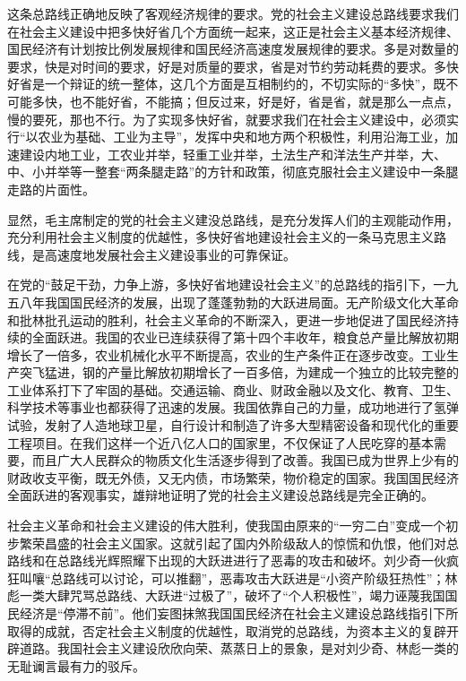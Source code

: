 \documentclass{book}
\begin{document}
这条总路线正确地反映了客观经济规律的要求。党的社会主义建设总路线要求我们在社会主义建设中把多快好省几个方面统一起来，这正是社会主义基本经济规律、国民经济有计划按比例发展规律和国民经济高速度发展规律的要求。多是对数量的要求，快是对时间的要求，好是对质量的要求，省是对节约劳动耗费的要求。多快好省是一个辩证的统一整体，这几个方面是互相制约的，不切实际的“多快”，既不可能多快，也不能好省，不能搞；但反过来，好是好，省是省，就是那么一点点，慢的要死，那也不行。为了实现多快好省，就要求我们在社会主义建设中，必须实行“以农业为基础、工业为主导”，发挥中央和地方两个积极性，利用沿海工业，加速建设内地工业，工农业并举，轻重工业并举，土法生产和洋法生产并举，大、中、小并举等一整套“两条腿走路”的方针和政策，彻底克服社会主义建设中一条腿走路的片面性。

显然，毛主席制定的党的社会主义建没总路线，是充分发挥人们的主观能动作用，充分利用社会主义制度的优越性，多快好省地建设社会主义的一条马克思主义路线，是高速度地发展社会主义建设事业的可靠保证。

在党的“鼓足干劲，力争上游，多快好省地建设社会主义”的总路线的指引下，一九五八年我国国民经济的发展，出现了蓬蓬勃勃的大跃进局面。无产阶级文化大革命和批林批孔运动的胜利，社会主义革命的不断深入，更进一步地促进了国民经济持续的全面跃进。我国的农业已连续获得了第十四个丰收年，粮食总产量比解放初期增长了一倍多，农业机械化水平不断提高，农业的生产条件正在逐步改变。工业生产突飞猛进，钢的产量比解放初期增长了一百多倍，为建成一个独立的比较完整的工业体系打下了牢固的基础。交通运输、商业、财政金融以及文化、教育、卫生、科学技术等事业也都获得了迅速的发展。我国依靠自己的力量，成功地进行了氢弹试验，发射了人造地球卫星，自行设计和制造了许多大型精密设备和现代化的重要工程项目。在我们这样一个近八亿人口的国家里，不仅保证了人民吃穿的基本需要，而且广大人民群众的物质文化生活逐步得到了改善。我国已成为世界上少有的财政收支平衡，既无外债，又无内债，市场繁荣，物价稳定的国家。我国国民经济全面跃进的客观事实，雄辩地证明了党的社会主义建设总路线是完全正确的。

社会主义革命和社会主义建设的伟大胜利，使我国由原来的“一穷二白”变成一个初步繁荣昌盛的社会主义国家。这就引起了国内外阶级敌人的惊慌和仇恨，他们对总路线和在总路线光辉照耀下出现的大跃进进行了恶毒的攻击和破坏。刘少奇一伙疯狂叫嚷“总路线可以讨论，可以推翻”，恶毒攻击大跃进是“小资产阶级狂热性”；林彪一类大肆咒骂总路线、大跃进“过极了”，破坏了“个人积极性”，竭力诬蔑我国国民经济是“停滞不前”。他们妄图抹煞我国国民经济在社会主义建设总路线指引下所取得的成就，否定社会主义制度的优越性，取消党的总路线，为资本主义的复辟开辟道路。我国社会主义建设欣欣向荣、蒸蒸日上的景象，是对刘少奇、林彪一类的无耻谰言最有力的驳斥。
\end{document}

